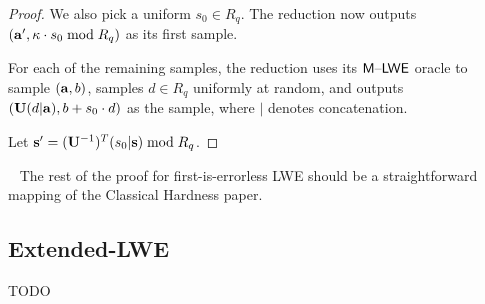 \documentclass[oribibl,envcountsect,envcountsame]{llncs}
\begin{document}
\begin{proof}
We also pick a uniform $s_0 \in R_q$. The reduction now outputs $(\mathbf{a}',\kappa \cdot s_0 \bmod{R_q})$ as 
its first sample. 

For each of the remaining samples, the reduction uses its $\mathsf{M \text{\textendash} LWE}$ oracle to sample $(\mathbf{a}, b)$, 
samples $d \in R_q$ uniformly at random, and outputs $(\mathbf{U}(d|\mathbf{a}), b + s_0 \cdot d)$ as the sample, where $|$ denotes concatenation.

Let $\mathbf{s}' = (\mathbf{U}^{-1})^{T}(s_0|\mathbf{s}) \bmod{R_q}$. 




\end{proof}

~\cite{DBLP:conf/crypto/ApplebaumCPS09}
The rest of the proof for first-is-errorless LWE should be a straightforward mapping of the 
Classical Hardness paper.

\subsection{Extended-LWE}

TODO









\end{document}
